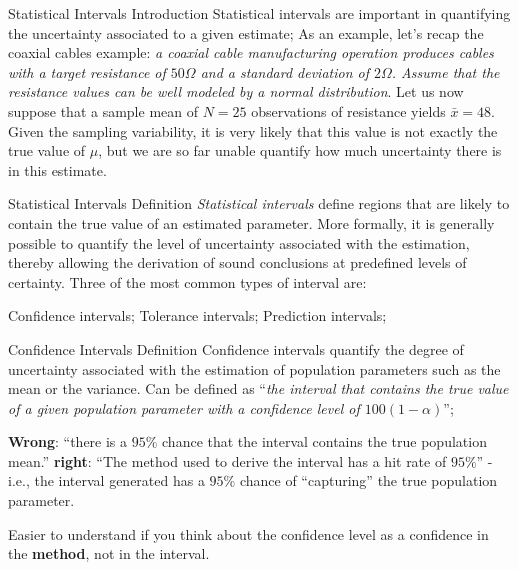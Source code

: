 \documentclass[t]{beamer}
\begin{document}

\begin{ftst}
{Statistical Intervals}
{Introduction}
Statistical intervals are important in quantifying the uncertainty associated to a given estimate;
\vone
As an example, let's recap the coaxial cables example: \textit{a coaxial cable manufacturing operation produces cables with a target resistance of $50\Omega$ and a standard deviation of $2\Omega$. Assume that the resistance values can be well modeled by a normal distribution}.
\vone
Let us now suppose that a sample mean of $N=25$ observations of resistance  yields $\bar{x} = 48$. Given the sampling variability, it is very likely that this value is not exactly the true value of $\mu$, but we are so far unable quantify how much uncertainty there is in this estimate.
\end{ftst}


\begin{ftst}
{Statistical Intervals}
{Definition}
\textit{Statistical intervals} define regions that are likely to contain the true value of an estimated parameter. 
\vone
More formally, it is generally possible to quantify the level of uncertainty associated with the estimation, thereby allowing the derivation of sound conclusions at predefined levels of certainty.
\vone
Three of the most common types of interval are:

\bitems Confidence intervals;
	\spitem Tolerance intervals;
	\spitem Prediction intervals;
\eitem
\end{ftst}


\begin{ftst}
{Confidence Intervals}
{Definition}
Confidence intervals quantify the degree of uncertainty associated with the estimation of population parameters such as the mean or the variance.
\vone
Can be defined as ``\textit{the interval that contains the true value of a given population parameter with a confidence level of $100(1-\alpha)$}'';

\bitems \textbf{Wrong}: ``there is a $95\%$ chance that the interval contains the true population mean.''
\spitem \textbf{right}: ``The method used to derive the interval has a hit rate of $95\%$'' - i.e., the interval generated has a $95\%$ chance of ``capturing'' the true population parameter.
\eitem

Easier to understand if you think about the confidence level as a confidence in the \textbf{method}, not in the interval.
\end{ftst}
\end{document}
